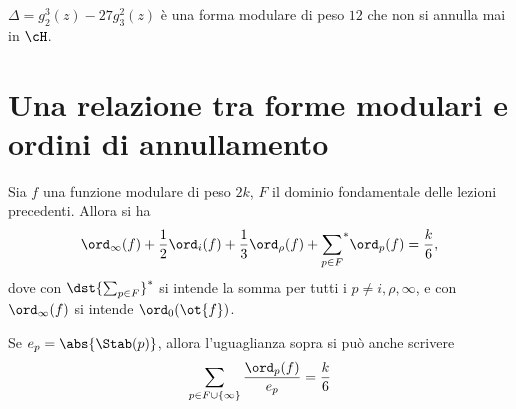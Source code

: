 \begin{osservazione}
$\Delta = g_2 ^3 (z) - 27 g_3 ^2 (z)$ è una forma modulare di peso $12$ che
non si annulla mai in $\cH$.
\end{osservazione}


\section{Una relazione tra forme modulari e ordini di annullamento}

\begin{teorema} \label{170201-forme-ordini}
	Sia $f$ una funzione modulare di peso $2k$, $F$ il dominio fondamentale delle lezioni precedenti. Allora si ha
	\begin{equation*}
	\ord_\infty(f)+\frac{1}{2}\ord_i(f)+\frac{1}{3}\ord_{\rho}(f)+{\sum_{p\in F}}^{*}\ord_p(f)=\frac{k}{6},
	\end{equation*}
	dove con $\dst{\sum_{p\in F}}^{*}$ si intende la somma per tutti i $p \neq i, \rho, \infty$, e con $\ord_\infty(f)$ si intende $\ord_0(\ot{f})$.
	
	Se $e_p=\abs{\Stab(p)}$, allora l'uguaglianza sopra si può anche scrivere
	\begin{equation*}
		\sum_{p\in F \cup \{\infty\}} \frac{\ord_p(f)}{e_p}=\frac{k}{6}
	\end{equation*}
\end{teorema}

